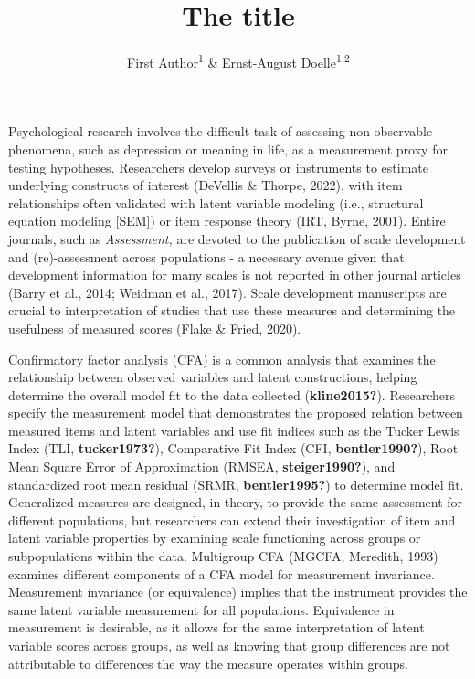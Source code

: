 \documentclass[
  man]{apa7}
\title{The title}
\author{First Author\textsuperscript{1} \& Ernst-August Doelle\textsuperscript{1,2}}
\date{}
\affiliation{\vspace{0.5cm}\textsuperscript{1} Wilhelm-Wundt-University\\\textsuperscript{2} Konstanz Business School}
\begin{document}
\maketitle

Psychological research involves the difficult task of assessing non-observable phenomena, such as depression or meaning in life, as a measurement proxy for testing hypotheses. Researchers develop surveys or instruments to estimate underlying constructs of interest (DeVellis \& Thorpe, 2022), with item relationships often validated with latent variable modeling (i.e., structural equation modeling {[}SEM{]}) or item response theory (IRT, Byrne, 2001). Entire journals, such as \emph{Assessment,} are devoted to the publication of scale development and (re)-assessment across populations - a necessary avenue given that development information for many scales is not reported in other journal articles (Barry et al., 2014; Weidman et al., 2017). Scale development manuscripts are crucial to interpretation of studies that use these measures and determining the usefulness of measured scores (Flake \& Fried, 2020).

Confirmatory factor analysis (CFA) is a common analysis that examines the relationship between observed variables and latent constructions, helping determine the overall model fit to the data collected (\textbf{kline2015?}). Researchers specify the measurement model that demonstrates the proposed relation between measured items and latent variables and use fit indices such as the Tucker Lewis Index (TLI, \textbf{tucker1973?}), Comparative Fit Index (CFI, \textbf{bentler1990?}), Root Mean Square Error of Approximation (RMSEA, \textbf{steiger1990?}), and standardized root mean residual (SRMR, \textbf{bentler1995?}) to determine model fit. Generalized measures are designed, in theory, to provide the same assessment for different populations, but researchers can extend their investigation of item and latent variable properties by examining scale functioning across groups or subpopulations within the data. Multigroup CFA (MGCFA, Meredith, 1993) examines different components of a CFA model for measurement invariance. Measurement invariance (or equivalence) implies that the instrument provides the same latent variable measurement for all populations. Equivalence in measurement is desirable, as it allows for the same interpretation of latent variable scores across groups, as well as knowing that group differences are not attributable to differences the way the measure operates within groups.
\end{document}
